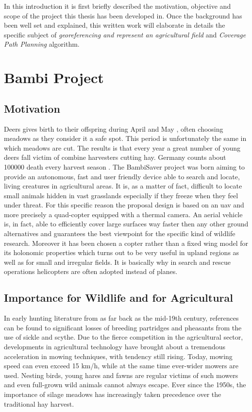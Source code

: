 


In this introduction it is first briefly described the motivation, objective and scope of the project this thesis has been developed in. Once the background has been well set and explained, this written work will elaborate in details the specific subject of \textit{georeferencing and represent an agricultural field} and \textit{Coverage Path Planning} algorithm.
\section{Bambi Project} %
\label{sec:bambi_project}

\subsection{Motivation} %
\label{ssec:motivation}
 Deers gives birth to their offspring during April and May \cite{MowlingMortality}, often choosing meadows as they consider it a safe spot. This period is unfortunately the same in which meadows are cut. The results is that every year a great number of young deers fall victim of combine harvesters cutting hay. Germany counts about 100000 death every harvest season \cite{MowlingMortality}.
 The BambiSaver project was born aiming to provide an autonomous, fast and user friendly device able to search and locate, living creatures in agricultural areas. It is, as a matter of fact, difficult to locate small animals hidden in vast grasslands especially if they freeze when they feel under threat. For this specific reason the proposal design is based on an \acrfull{uav}\cite{ICAO} and more precisely a quad-copter equipped with a thermal camera.
 An aerial vehicle is, in fact, able to efficiently cover large surfaces way faster then any other ground alternatives and guarantees the best viewpoint for the specific kind of wildlife research. Moreover it has been chosen a copter rather than a fixed wing model for its holonomic properties which turns out to be very useful in upland regions as well as for small and irregular fields. It is basically why in search and rescue operations helicopters are often adopted instead of planes.

\subsection{Importance for Wildlife and for Agricultural}
In early hunting literature from as far back as the mid-19th century, references can be found to significant losses of breeding partridges and pheasants from the use of sickle and scythe. Due to the fierce competition in the agricultural sector, developments in agricultural technology have brought about a tremendous acceleration in mowing techniques, with tendency still rising. Today, mowing speed can even exceed 15 km/h, while at the same time ever-wider mowers are used. Nesting birds, young hares and fawns are regular victims of such mowers and even full-grown wild animals cannot always escape. Ever since the 1950s, the importance of silage meadows has increasingly taken precedence over the traditional hay harvest.

